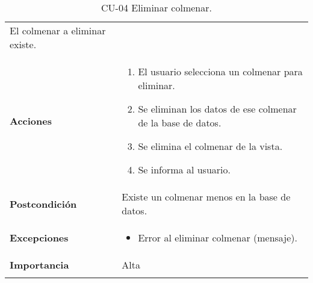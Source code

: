 \begin{longtable}[H]{@{}ll@{}}
\begin{minipage}[t]{0.65\columnwidth}
El colmenar a eliminar existe.\strut
\end{minipage}\tabularnewline
\begin{minipage}[t]{0.29\columnwidth}\raggedright\strut
\textbf{Acciones}\strut
\end{minipage} & \begin{minipage}[t]{0.65\columnwidth}\raggedright\strut
\begin{enumerate}
\def\labelenumi{\arabic{enumi}.}
\tightlist
\item
  El usuario selecciona un colmenar para eliminar.
\item
  Se eliminan los datos de ese colmenar de la base de datos.
\item
  Se elimina el colmenar de la vista.
\item
  Se informa al usuario.
\end{enumerate}\strut
\end{minipage}\tabularnewline
\begin{minipage}[t]{0.29\columnwidth}\raggedright\strut
\textbf{Postcondición}\strut
\end{minipage} & \begin{minipage}[t]{0.65\columnwidth}\raggedright\strut
Existe un colmenar menos en la base de datos.\strut
\end{minipage}\tabularnewline
\begin{minipage}[t]{0.29\columnwidth}\raggedright\strut
\textbf{Excepciones}\strut
\end{minipage} & \begin{minipage}[t]{0.65\columnwidth}\raggedright\strut
\begin{itemize}
\tightlist
\item
  Error al eliminar colmenar (mensaje).
\end{itemize}\strut
\end{minipage}\tabularnewline
\begin{minipage}[t]{0.29\columnwidth}\raggedright\strut
\textbf{Importancia}\strut
\end{minipage} & \begin{minipage}[t]{0.65\columnwidth}\raggedright\strut
Alta\strut
\end{minipage}\tabularnewline
\bottomrule
\caption{CU-04 Eliminar colmenar.}
\end{longtable}

